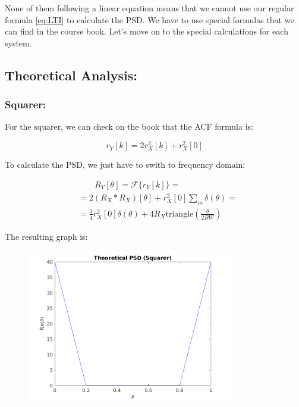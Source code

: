 \documentclass[a4paper,11pt]{article}
\begin{document}
None of them following a linear equation means that we cannot use our regular
formula \eqref{eq:LTI} to calculate the PSD. We have to use special formulas
that we can find in the course book. Let's move on to the special calculations
for each system.

\newpage

\subsection{Theoretical Analysis:}

\subsubsection{Squarer:}

For the squarer, we can check on the book that the ACF formula is:

\begin{equation}\label{eq:r_sq}
  r_Y[k] = 2r_X^2[k] + r_X^2[0]
\end{equation}

To calculate the PSD, we just have to swith to frequency domain:

\begin{equation}\label{eq:R_sq}
  \begin{split}
    & \qquad R_Y[\theta] = \mathcal{F}\{r_Y[k]\} = \\
    & = 2 (R_X \ast R_X)[\theta] +
    r_X^2[0]\displaystyle\sum_{m}\delta(\theta) = \\
    & = \displaystyle\frac{1}{4} r_X^2[0]\delta(\theta) +
    4 R_X \text{triangle}(\frac{\theta}{2 BW})
  \end{split}
\end{equation}

The resulting graph is:

\begin{figure}[!hp]
    \begin{center}
      \includegraphics[width=0.8\textwidth]{images/study3/R_th_sq.png}
    \end{center}
\end{figure}
\end{document}
